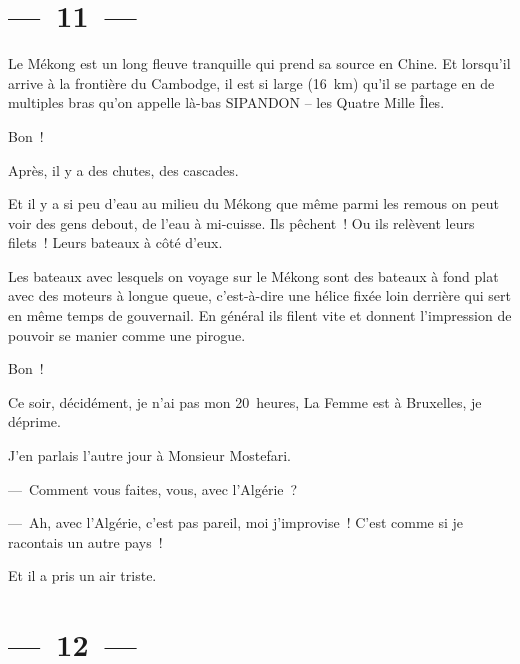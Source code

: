 \documentclass[french,twoside]{book} %
\begin{document}
\section[{— 11 —}]{— 11 —}
\renewcommand{\leftmark}{— 11 —}

\noindent Le Mékong est un long fleuve tranquille qui prend sa source en Chine. Et lorsqu’il arrive à la frontière du Cambodge, il est si large (16 km) qu’il se partage en de multiples bras qu’on appelle là-bas SIPANDON – les Quatre Mille Îles.\par
Bon !\par
Après, il y a des chutes, des cascades.\par
Et il y a si peu d’eau au milieu du Mékong que même parmi les remous on peut voir des gens debout, de l’eau à mi-cuisse. Ils pêchent ! Ou ils relèvent leurs filets ! Leurs bateaux à côté d’eux.\par
Les bateaux avec lesquels on voyage sur le Mékong sont des bateaux à fond plat avec des moteurs à longue queue, c’est-à-dire une hélice fixée loin derrière qui sert en même temps de gouvernail. En général ils filent vite et donnent l’impression de pouvoir se manier comme une pirogue.\par
Bon !\par
Ce soir, décidément, je n’ai pas mon 20 heures, La Femme est à Bruxelles, je déprime.\par
J’en parlais l’autre jour à Monsieur Mostefari.\par
— Comment vous faites, vous, avec l’Algérie ?\par
— Ah, avec l’Algérie, c’est pas pareil, moi j’improvise ! C’est comme si je racontais un autre pays !\par
Et il a pris un air triste.

\section[{— 12 —}]{— 12 —}
\renewcommand{\leftmark}{— 12 —}
\end{document}
